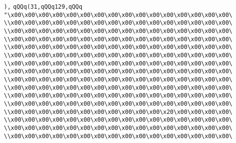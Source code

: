 \verb|),|\newline
\verb|qQQq(31,qQQq129,qQQq|\newline
\verb|"\x00\x00\x00\x00\x00\x00\x00\x00\x00\x00\x00\x00\x00\x00\x00\x00\|\newline
\verb|\\x00\x00\x00\x00\x00\x00\x00\x00\x00\x00\x00\x00\x00\x00\x00\x00\|\newline
\verb|\\x00\x00\x00\x00\x00\x00\x00\x00\x00\x00\x00\x00\x00\x00\x00\x00\|\newline
\verb|\\x00\x00\x00\x00\x00\x00\x00\x00\x00\x00\x00\x00\x00\x00\x00\x00\|\newline
\verb|\\x00\x00\x00\x00\x00\x00\x00\x00\x00\x00\x00\x00\x00\x00\x00\x00\|\newline
\verb|\\x00\x00\x00\x00\x00\x00\x00\x00\x00\x00\x00\x00\x00\x00\x00\x00\|\newline
\verb|\\x00\x00\x00\x00\x00\x00\x00\x00\x00\x00\x00\x00\x00\x00\x00\x00\|\newline
\verb|\\x00\x00\x00\x00\x00\x00\x00\x00\x00\x00\x00\x00\x00\x00\x00\x00\|\newline
\verb|\\x00\x00\x00\x00\x00\x00\x00\x00\x00\x00\x00\x00\x00\x00\x00\x00\|\newline
\verb|\\x00\x00\x00\x00\x00\x00\x00\x00\x00\x00\x00\x00\x00\x00\x00\x00\|\newline
\verb|\\x00\x00\x00\x00\x00\x00\x00\x00\x00\x00\x00\x00\x00\x00\x00\x00\|\newline
\verb|\\x00\x00\x00\x00\x00\x00\x00\x00\x00\x00\x00\x00\x00\x00\x00\x00\|\newline
\verb|\\x00\x00\x00\x00\x00\x00\x00\x00\x00\x00\x00\x20\x00\x00\x00\x00\|\newline
\verb|\\x00\x00\x00\x00\x00\x00\x00\x00\x00\x00\x00\x00\x00\x00\x00\x00\|\newline
\verb|\\x00\x00\x00\x00\x00\x00\x00\x00\x00\x00\x00\x00\x00\x00\x00\x00\|\newline
\verb|\\x00\x00\x00\x00\x00\x00\x00\x00\x00\x00\x00\x00\x00\x00\x00\x00\|\newline
